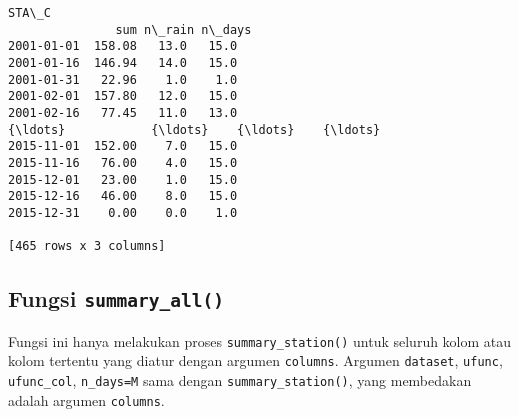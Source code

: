 \documentclass[11pt]{article}
\makeatletter
\newcommand{\boxspacing}{\kern\kvtcb@left@rule\kern\kvtcb@boxsep}
\newcommand{\prompt}[4]{
        \ttfamily\llap{{\color{#2}[#3]:\hspace{3pt}#4}}\vspace{-\baselineskip}
    }
\makeatother
\begin{document}
            \begin{tcolorbox}[breakable, size=fbox, boxrule=.5pt, pad at break*=1mm, opacityfill=0]
\prompt{Out}{outcolor}{9}{\boxspacing}
\begin{Verbatim}[commandchars=\\\{\}]
             STA\_C
               sum n\_rain n\_days
2001-01-01  158.08   13.0   15.0
2001-01-16  146.94   14.0   15.0
2001-01-31   22.96    1.0    1.0
2001-02-01  157.80   12.0   15.0
2001-02-16   77.45   11.0   13.0
{\ldots}            {\ldots}    {\ldots}    {\ldots}
2015-11-01  152.00    7.0   15.0
2015-11-16   76.00    4.0   15.0
2015-12-01   23.00    1.0   15.0
2015-12-16   46.00    8.0   15.0
2015-12-31    0.00    0.0    1.0

[465 rows x 3 columns]
\end{Verbatim}
\end{tcolorbox}
        
    \hypertarget{fungsi-summary_all}{%
\subsection{\texorpdfstring{Fungsi
\texttt{summary\_all()}}{Fungsi summary\_all()}}\label{fungsi-summary_all}}

Fungsi ini hanya melakukan proses \texttt{summary\_station()} untuk
seluruh kolom atau kolom tertentu yang diatur dengan argumen
\texttt{columns}. Argumen \texttt{dataset}, \texttt{ufunc},
\texttt{ufunc\_col},
\texttt{n\_days=\textquotesingle{}M\textquotesingle{}} sama dengan
\texttt{summary\_station()}, yang membedakan adalah argumen
\texttt{columns}.
\end{document}
